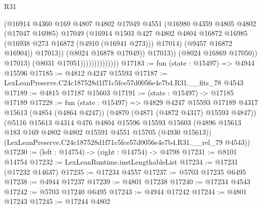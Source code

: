 \begin{lexlean}{R31}
\begin{coremodule}
                                          (@16914
                                            @4360
                                            @169
                                            @4807
                                            @4802
                                            @17049
                                            @4551
                                            (@16980
                                              @4359
                                              @4805
                                              @4802
                                              (@17047 @16985)
                                              @17049
                                              (@16914
                                                @1503
                                                @427
                                                @4802
                                                @4804
                                                @16872
                                                @16985
                                                (@16938 @273 @16872 (@4910 (@16941 @273)))
                                                @17014)
                                              (@9457 @16872 @16904))
                                            @17013))
                                        (@8024 @16878 @17049))
                                      @17013))
                                  (@8024 @16869 @17050))
                                @17013)
                              (@8031 @17051))))))))))))))
@17183 := fun (state : @15497) => @4944 @15596
@17185 := @4812 @4247 @15593
@17187 := LexLeanPreserve.C24c187528d1f71c5fce57d0056e4e7b4.R31.__fits_78 @4543
@17189 := @4815 @17187 @15603
@17191 := (state : @15497) -> @17185 @17189
@17228 := fun (state : @15497) =>
  @4829
    @4247
    @15593
    @17189
    @4317
    @15613
    (@4854 (@4864 @4247))
    (@4870 (@4871 (@4872 @4317) @15593 @4847))
    (@5116
      @15613
      @4314
      @476
      @4804
      @15596
      @15593
      @15603
      (@4896 @15613 @183 @169 @4802 @4802 @15591 @4551 @15705 (@4930 @15613))
      (LexLeanPreserve.C24c187528d1f71c5fce57d0056e4e7b4.R31.__rel_79 @4543))
@17230 := (left : @14754) -> (right : @14754) -> @4798
@17231 := @8101 @14754
@17232 := LexLeanRuntime.instLengthableList
@17234 := @17231 (@17232 @14637)
@17235 := @17234 @4557
@17237 := @5703 @17235 @6495
@17238 := @4944 @17237
@17239 := @4801 @17238
@17240 := @17234 @4543
@17242 := @5703 @17240 @6495
@17243 := @4944 @17242
@17244 := @4801 @17243
@17245 := @17244 @4802

\end{coremodule}
\end{lexlean}

